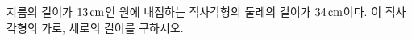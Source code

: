 지름의 길이가 $13\mkern3mu \mathrm{cm}$인 원에 내접하는 직사각형의 둘레의 길이가 $34\mkern3mu \mathrm{cm}$이다. 이 직사각형의 가로, 세로의 길이를 구하시오. 
